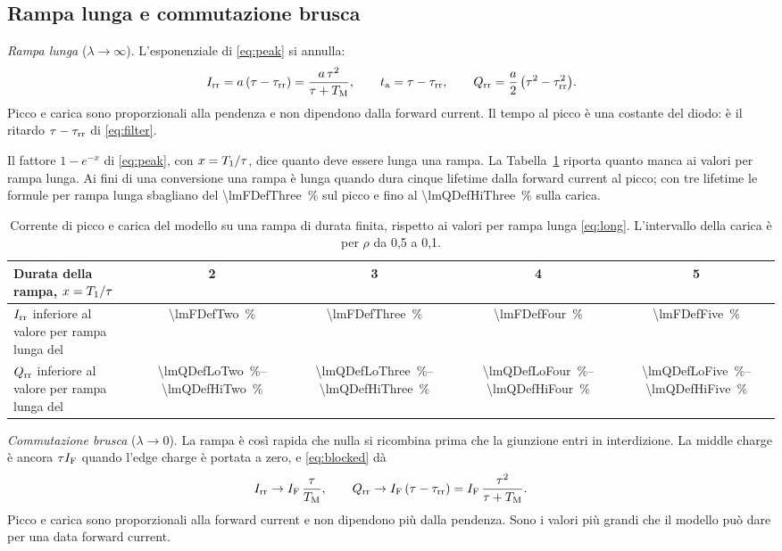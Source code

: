 \documentclass[10pt,a4paper]{scrartcl}
\let\newcommand\lmitdefine
\newcommand{\IF}{I_\mathrm{F}}
\newcommand{\Irr}{I_\mathrm{rr}}
\newcommand{\Qrr}{Q_\mathrm{rr}}
\newcommand{\ta}{t_\mathrm{a}}
\newcommand{\taurr}{\tau_\mathrm{rr}}
\newcommand{\TM}{T_\mathrm{M}}
\newcommand{\Tone}{T_1}
\begin{document}
\subsection{Rampa lunga e commutazione brusca}
\label{sec:limitsramp}
\emph{Rampa lunga} ($\lambda \to \infty$). L'esponenziale di \eqref{eq:peak} si annulla:
\begin{equation}
\Irr = a\,(\tau - \taurr) = \frac{a\,\tau^2}{\tau+\TM} , \qquad \ta = \tau - \taurr , \qquad \Qrr = \frac{a}{2}\,\bigl(\tau^2 - \taurr^2\bigr) .
\label{eq:long}
\end{equation}
Picco e carica sono proporzionali alla pendenza e non dipendono dalla forward current. Il tempo al picco è una costante del diodo: è il ritardo $\tau - \taurr$ di \eqref{eq:filter}.

Il fattore $1 - e^{-x}$ di \eqref{eq:peak}, con $x = \Tone/\tau$, dice quanto deve essere lunga una rampa. La Tabella~\ref{tab:long} riporta quanto manca ai valori per rampa lunga. Ai fini di una conversione una rampa è lunga quando dura cinque lifetime dalla forward current al picco; con tre lifetime le formule per rampa lunga sbagliano del \SI{\lmFDefThree}{\percent} sul picco e fino al \SI{\lmQDefHiThree}{\percent} sulla carica.

\begin{table}[htb]
\centering\small
\caption{Corrente di picco e carica del modello su una rampa di durata finita, rispetto ai valori per rampa lunga \eqref{eq:long}. L'intervallo della carica è per $\rho$ da 0,5 a 0,1.}
\label{tab:long}
\begin{tabular}{@{}lcccc@{}}
\toprule
Durata della rampa, $x = \Tone/\tau$ & 2 & 3 & 4 & 5 \\
\midrule
$\Irr$ inferiore al valore per rampa lunga del & \SI{\lmFDefTwo}{\percent} & \SI{\lmFDefThree}{\percent} & \SI{\lmFDefFour}{\percent} & \SI{\lmFDefFive}{\percent} \\
$\Qrr$ inferiore al valore per rampa lunga del & \SIrange{\lmQDefLoTwo}{\lmQDefHiTwo}{\percent} & \SIrange{\lmQDefLoThree}{\lmQDefHiThree}{\percent} & \SIrange{\lmQDefLoFour}{\lmQDefHiFour}{\percent} & \SIrange{\lmQDefLoFive}{\lmQDefHiFive}{\percent} \\
\bottomrule
\end{tabular}
\end{table}

\emph{Commutazione brusca} ($\lambda \to 0$). La rampa è così rapida che nulla si ricombina prima che la giunzione entri in interdizione. La middle charge è ancora $\tau\IF$ quando l'edge charge è portata a zero, e \eqref{eq:blocked} dà
\begin{equation}
\Irr \to \IF\,\frac{\tau}{\TM} , \qquad \Qrr \to \IF\,(\tau - \taurr) = \IF\,\frac{\tau^2}{\tau+\TM} .
\label{eq:abrupt}
\end{equation}
Picco e carica sono proporzionali alla forward current e non dipendono più dalla pendenza. Sono i valori più grandi che il modello può dare per una data forward current.
\end{document}
